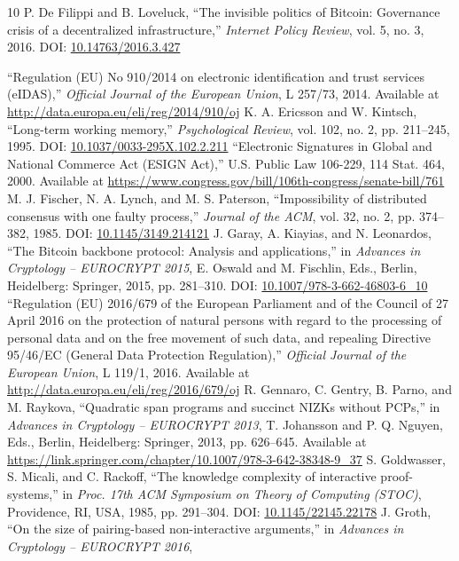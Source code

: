 \documentclass{ieeeaccess}
\begin{document}
\begin{thebibliography}{10}
P. De Filippi and B. Loveluck, 
``The invisible politics of Bitcoin: Governance crisis of a decentralized infrastructure,'' 
\emph{Internet Policy Review}, vol. 5, no. 3, 2016. 
DOI: \url{10.14763/2016.3.427}

``Regulation (EU) No 910/2014 on electronic identification and trust services (eIDAS),'' 
\emph{Official Journal of the European Union}, L 257/73, 2014.
Available at \url{http://data.europa.eu/eli/reg/2014/910/oj}
K. A. Ericsson and W. Kintsch, 
``Long-term working memory,'' 
\emph{Psychological Review}, vol. 102, no. 2, pp. 211--245, 1995.
DOI: \url{10.1037/0033-295X.102.2.211}
``Electronic Signatures in Global and National Commerce Act (ESIGN Act),'' 
U.S. Public Law 106-229, 114 Stat. 464, 2000.
Available at \url{https://www.congress.gov/bill/106th-congress/senate-bill/761}
M. J. Fischer, N. A. Lynch, and M. S. Paterson, 
``Impossibility of distributed consensus with one faulty process,'' 
\emph{Journal of the ACM}, vol. 32, no. 2, pp. 374--382, 1985.
DOI: \url{10.1145/3149.214121}
J. Garay, A. Kiayias, and N. Leonardos, 
``The Bitcoin backbone protocol: Analysis and applications,'' 
in \emph{Advances in Cryptology -- EUROCRYPT 2015}, 
E. Oswald and M. Fischlin, Eds., Berlin, Heidelberg: Springer, 2015, pp. 281--310.
DOI: \url{10.1007/978-3-662-46803-6_10}
``Regulation (EU) 2016/679 of the European Parliament and of the Council of 27 April 2016 
on the protection of natural persons with regard to the processing of personal data and 
on the free movement of such data, and repealing Directive 95/46/EC (General Data Protection 
Regulation),'' \emph{Official Journal of the European Union}, L 119/1, 2016.
Available at \url{http://data.europa.eu/eli/reg/2016/679/oj}
R. Gennaro, C. Gentry, B. Parno, and M. Raykova, 
``Quadratic span programs and succinct NIZKs without PCPs,'' 
in \emph{Advances in Cryptology -- EUROCRYPT 2013}, 
T. Johansson and P. Q. Nguyen, Eds., Berlin, Heidelberg: Springer, 2013, pp. 626--645.
Available at \url{https://link.springer.com/chapter/10.1007/978-3-642-38348-9_37}
S. Goldwasser, S. Micali, and C. Rackoff, 
``The knowledge complexity of interactive proof-systems,'' 
in \emph{Proc. 17th ACM Symposium on Theory of Computing (STOC)}, 
Providence, RI, USA, 1985, pp. 291--304.
DOI: \url{10.1145/22145.22178}
J. Groth, 
``On the size of pairing-based non-interactive arguments,'' 
in \emph{Advances in Cryptology -- EUROCRYPT 2016}, 

\end{thebibliography}
\end{document}
